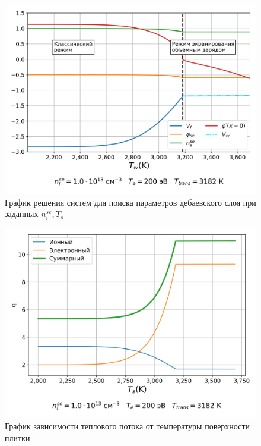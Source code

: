 \begin{figure}[H]
	\centering
	\includegraphics[width=0.7\linewidth]{material/Te=200eV_nse=1.0e13.png}
    \caption[]{График решения систем для поиска параметров дебаевского слоя при заданных $n_i^{se}, T_s$}
	\label{pic::Model::results::Te-200eV_ne-1e13cm^-3}
\end{figure}

\begin{figure}[H]
	\centering
	\includegraphics[width=0.7\linewidth]{material/q_plot_Te=200eV_nse=1.0e13.png}
    \caption[]{График зависимости теплового потока от температуры поверхности плитки}
	\label{pic::Model::results::q_Te-200eV_ne-1e13cm^-3}
\end{figure}

